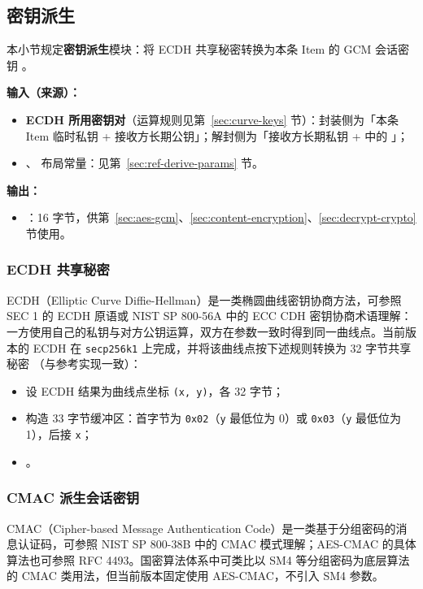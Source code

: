 \subsection{密钥派生}\label{sec:key-derivation}
本小节规定\textbf{密钥派生}模块：将 ECDH 共享秘密转换为本条 Item 的 GCM 会话密钥 。

\textbf{输入（来源）：}
\begin{itemize}
  \item \textbf{ECDH 所用密钥对}（运算规则见第~\ref{sec:curve-keys} 节）：封装侧为「本条 Item 临时私钥 + 接收方长期公钥」；解封侧为「接收方长期私钥 +  中的 」；
  \item {}、 布局常量：见第~\ref{sec:ref-derive-params} 节。
\end{itemize}

\textbf{输出：}
\begin{itemize}
  \item {}：16 字节，供第~\ref{sec:aes-gcm}、\ref{sec:content-encryption}、\ref{sec:decrypt-crypto} 节使用。
\end{itemize}

\subsubsection{ECDH 共享秘密}\label{sec:ecdh-shared-secret}
ECDH（Elliptic Curve Diffie-Hellman）是一类椭圆曲线密钥协商方法，可参照 SEC 1 的 ECDH 原语或 NIST SP
800-56A 中的 ECC CDH 密钥协商术语理解：一方使用自己的私钥与对方公钥运算，双方在参数一致时得到同一曲线点。当前版本的 ECDH 在
\texttt{secp256k1} 上完成，并将该曲线点按下述规则转换为 32 字节共享秘密 （与参考实现一致）：
\begin{itemize}
  \item 设 ECDH 结果为曲线点坐标 \texttt{(x, y)}，各 32 字节；
  \item 构造 33 字节缓冲区：首字节为 \texttt{0x02}（\texttt{y} 最低位为 0）或 \texttt{0x03}（\texttt{y} 最低位为 1），后接 \texttt{x}；
  \item {}。
\end{itemize}

\subsubsection{CMAC 派生会话密钥}\label{sec:cmac-session-key}
CMAC（Cipher-based Message Authentication Code）是一类基于分组密码的消息认证码，可参照 NIST SP
800-38B 中的 CMAC 模式理解；AES-CMAC 的具体算法也可参照 RFC 4493。国密算法体系中可类比以 SM4 等分组密码为底层算法的
CMAC 类用法，但当前版本固定使用 AES-CMAC，不引入 SM4 参数。

